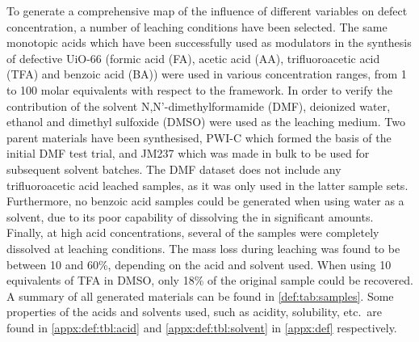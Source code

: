 To generate a comprehensive map of the influence
of different variables on defect concentration, a number of
leaching conditions have been selected. The same monotopic acids 
which have been successfully used
as modulators in the synthesis of defective UiO-66
(formic acid (FA), acetic acid (AA), trifluoroacetic acid (TFA)
and benzoic acid (BA)) were used in various concentration ranges,
from 1 to 100 molar equivalents with respect to the framework.
In order to verify the contribution of the solvent
N,N'-dimethylformamide (DMF), deionized water, ethanol and dimethyl
sulfoxide (DMSO) were used as the leaching medium.
Two parent materials have been synthesised, PWI-C which formed 
the basis of the initial DMF test trial, and JM237 which 
was made in bulk to be used for subsequent solvent batches.
The DMF dataset does not include any trifluoroacetic acid
leached samples, as it was only used in the latter sample sets.
Furthermore, no benzoic acid samples could be generated when using
water as a solvent, due to its poor capability of dissolving the
in significant amounts. Finally, at high acid concentrations,
several of the samples were completely dissolved at leaching
conditions. The mass loss during leaching was found to be 
between 10 and 60\%, depending on the acid and solvent used.
When using 10 equivalents of TFA in DMSO, only 18\% of the 
original sample could be recovered. 
A summary of all generated materials can be found in
\autoref{def:tab:samples}.
Some properties of the acids and solvents used, such as acidity,
solubility, etc.\ are found in 
\autoref{appx:def:tbl:acid} and \autoref{appx:def:tbl:solvent} in 
\autoref{appx:def} respectively.

